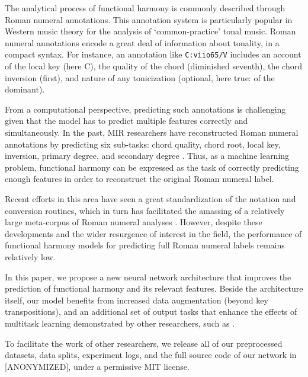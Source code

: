 The analytical process of functional harmony is commonly
described through Roman numeral annotations. This annotation
system is particularly popular in Western music theory for
the analysis of `common-practice' tonal music. Roman numeral
annotations encode a great deal of information about
tonality, in a compact syntax. For instance, an annotation
like  \texttt{C:viio65/V} includes an account of the local
key (here C), the quality of the chord (diminished seventh),
the chord inversion (first), and nature of any tonicization
(optional, here true: of the dominant).

From a computational perspective, predicting such
annotations is challenging given that the model has to
predict multiple features correctly and simultaneously. In
the past, MIR researchers have reconstructed Roman numeral
annotations by predicting six sub-tasks: chord quality,
chord root, local key, inversion, primary degree, and
secondary degree \cite{chen_functional_2018,
micchi_not_2020}.
%
Thus, as a machine learning problem, functional harmony can
be expressed as the task of correctly predicting enough
features in order to reconstruct the original Roman numeral
label.


Recent efforts in this area have seen a great
standardization of the notation and conversion routines,
\cite{gotham_romantext_2019} which in turn has facilitated
the amassing of a relatively large meta-corpus of Roman
numeral analyses \cite{gotham_romantext_2019}. However,
despite these developments and the wider resurgence of
interest in the field, the performance of functional harmony
models for predicting full Roman numeral labels remains
relatively low.

In this paper, we propose a new neural network architecture
that improves the prediction of functional harmony and its
relevant features. Beside the architecture itself, our model
benefits from increased data augmentation (beyond key
transpositions), and an additional set of output tasks that
enhance the effects of multitask learning demonstrated by
other researchers, such as \textcite{chen2018}.

To facilitate the work of other researchers, we release all
of our preprocessed datasets, data splits, experiment logs,
and the full source code of our network in [ANONYMIZED],
under a permissive MIT license.
